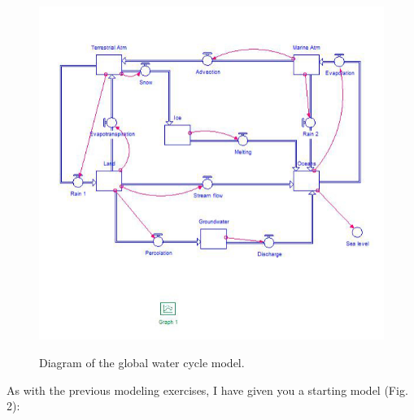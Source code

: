 \documentclass[11pt,letterpaper]{article}
\begin{document}
\begin{figure}[h]
\begin{center}
\includegraphics[]{./globalwatermodel}
\label{fig:model}
\caption{Diagram of the global water cycle model.}
\end{center}
\end{figure}

As with the previous modeling exercises, I have given you a starting model (Fig. 2):
\end{document}

